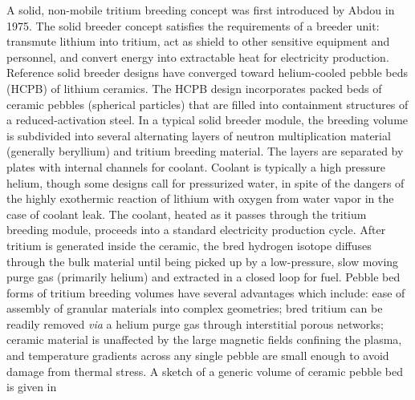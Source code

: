 

A solid, non-mobile tritium breeding concept was first introduced by Abdou\etal\cite{Abdou1975} in 1975. The solid breeder concept satisfies the requirements of a breeder unit: transmute lithium into tritium, act as shield to other sensitive equipment and personnel, and convert energy into extractable heat for electricity production. Reference solid breeder designs have converged toward helium-cooled pebble beds (HCPB) of lithium ceramics.  The HCPB design incorporates packed beds of ceramic pebbles (spherical particles) that are filled into containment structures of a reduced-activation steel. In a typical solid breeder module, the breeding volume is subdivided into several alternating layers of neutron multiplication material (generally beryllium) and tritium breeding material. The layers are separated by plates with internal channels for coolant. Coolant is typically a high pressure helium, though some designs call for pressurized water, in spite of the dangers of the highly exothermic reaction of lithium with oxygen from water vapor in the case of coolant leak. The coolant, heated as it passes through the tritium breeding module, proceeds into a standard electricity production cycle. After tritium is generated inside the ceramic, the bred hydrogen isotope diffuses through the bulk material until being picked up by a low-pressure, slow moving purge gas (primarily helium) and extracted in a closed loop for fuel. Pebble bed forms of tritium breeding volumes have several advantages which include: ease of assembly of granular materials into complex geometries; bred tritium can be readily removed \textit{via} a helium purge gas through interstitial porous networks; ceramic material is unaffected by the large magnetic fields confining the plasma, and temperature gradients across any single pebble are small enough to avoid damage from thermal stress. A sketch of a generic volume of ceramic pebble bed is given in 

